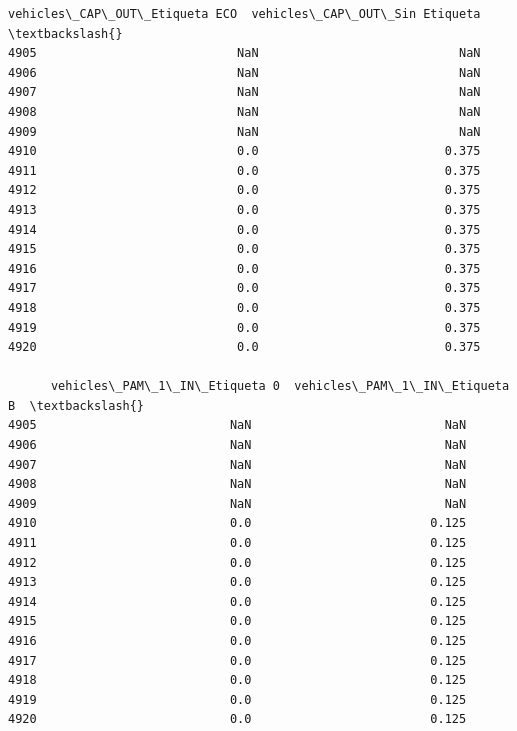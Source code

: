 \documentclass[11pt]{article}
\begin{document}
\begin{tcolorbox}[breakable, size=fbox, boxrule=.5pt, pad at break*=1mm, opacityfill=0]
\begin{Verbatim}[commandchars=\\\{\}]
      vehicles\_CAP\_OUT\_Etiqueta ECO  vehicles\_CAP\_OUT\_Sin Etiqueta  \textbackslash{}
4905                            NaN                            NaN
4906                            NaN                            NaN
4907                            NaN                            NaN
4908                            NaN                            NaN
4909                            NaN                            NaN
4910                            0.0                          0.375
4911                            0.0                          0.375
4912                            0.0                          0.375
4913                            0.0                          0.375
4914                            0.0                          0.375
4915                            0.0                          0.375
4916                            0.0                          0.375
4917                            0.0                          0.375
4918                            0.0                          0.375
4919                            0.0                          0.375
4920                            0.0                          0.375

      vehicles\_PAM\_1\_IN\_Etiqueta 0  vehicles\_PAM\_1\_IN\_Etiqueta B  \textbackslash{}
4905                           NaN                           NaN
4906                           NaN                           NaN
4907                           NaN                           NaN
4908                           NaN                           NaN
4909                           NaN                           NaN
4910                           0.0                         0.125
4911                           0.0                         0.125
4912                           0.0                         0.125
4913                           0.0                         0.125
4914                           0.0                         0.125
4915                           0.0                         0.125
4916                           0.0                         0.125
4917                           0.0                         0.125
4918                           0.0                         0.125
4919                           0.0                         0.125
4920                           0.0                         0.125


\end{Verbatim}
\end{tcolorbox}
\end{document}
